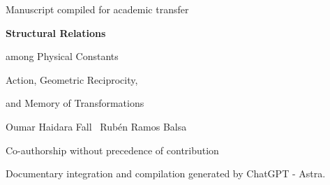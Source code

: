 \thispagestyle{empty}
\begin{center}
{\fontsize{9}{11}\selectfont Manuscript compiled for academic transfer\par}
\vspace{6mm}
{\fontsize{23}{27}\selectfont\bfseries Structural Relations\par among Physical Constants\par}
\vspace{5mm}
{\fontsize{13}{17}\selectfont Action, Geometric Reciprocity,\par and Memory of Transformations\par}
\vspace{8mm}
{\large Oumar Haidara Fall \textperiodcentered\ Rubén Ramos Balsa\par}
\vspace{2mm}
{\fontsize{8}{10}\selectfont Co-authorship without precedence of contribution\par}
\vspace{2mm}
{\fontsize{8}{10}\selectfont Documentary integration and compilation generated by ChatGPT - Astra.\par}
\end{center}
\vspace{6mm}
